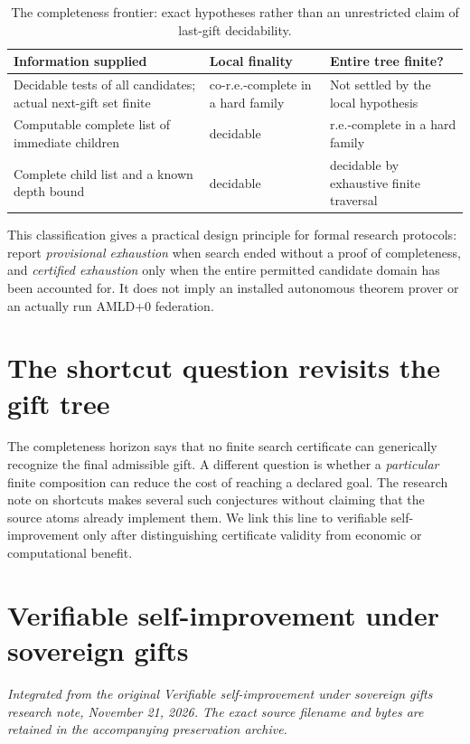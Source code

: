 \documentclass[11pt,letterpaper]{article}
\theoremstyle{definition}\newtheorem{definition}[theorem]{Definition}\newtheorem{example}[theorem]{Example}
\theoremstyle{remark}\newtheorem{remark}[theorem]{Remark}
\begin{document}
\begin{table}[htbp]\centering\small
\begin{tabularx}{\textwidth}{@{}p{}X X@{}}\toprule
Information supplied & Local finality & Entire tree finite? \\ \midrule
Decidable tests of all candidates; actual next-gift set finite & co-r.e.-complete in a hard family & Not settled by the local hypothesis \\
Computable complete list of immediate children & decidable & r.e.-complete in a hard family \\
Complete child list and a known depth bound & decidable & decidable by exhaustive finite traversal \\
\bottomrule\end{tabularx}
\caption{The completeness frontier: exact hypotheses rather than an unrestricted claim of last-gift decidability.}
\end{table}

This classification gives a practical design principle for formal research protocols: report \emph{provisional exhaustion} when search ended without a proof of completeness, and \emph{certified exhaustion} only when the entire permitted candidate domain has been accounted for. It does not imply an installed autonomous theorem prover or an actually run AMLD+0 federation.



\section{The shortcut question revisits the gift tree}\label{br:sec:shortcut-bridge}
The completeness horizon says that no finite search certificate can generically recognize the final admissible gift. A different question is whether a \emph{particular} finite composition can reduce the cost of reaching a declared goal. The research note on shortcuts makes several such conjectures without claiming that the source atoms already implement them. We link this line to verifiable self-improvement only after distinguishing certificate validity from economic or computational benefit.


\section{Verifiable self-improvement under sovereign gifts}\label{br:sec:mvsi}
\noindent\textit{Integrated from the original Verifiable self-improvement under sovereign gifts research note, November 21, 2026. The exact source filename and bytes are retained in the accompanying preservation archive.}
\end{document}
